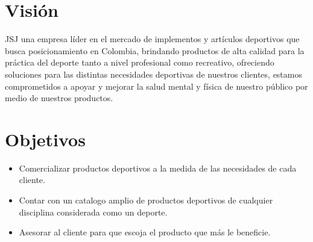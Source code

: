 \section{Visión}

 JSJ una empresa líder en el mercado de implementos y artículos deportivos que busca posicionamiento en Colombia, brindando productos de alta calidad para la práctica del deporte tanto a nivel profesional como recreativo, ofreciendo soluciones para las distintas necesidades deportivas de nuestros clientes,  estamos comprometidos a apoyar y mejorar la salud mental y física de nuestro público por medio de nuestros productos.
\newpage

\section{Objetivos}

\begin{itemize}
	\item Comercializar productos deportivos a la medida  de las necesidades de cada cliente.
	\item Contar con un catalogo amplio de productos deportivos de cualquier disciplina considerada como un deporte.
	\item Asesorar al cliente para que escoja el producto que más le beneficie.
\end{itemize}

\newpage


